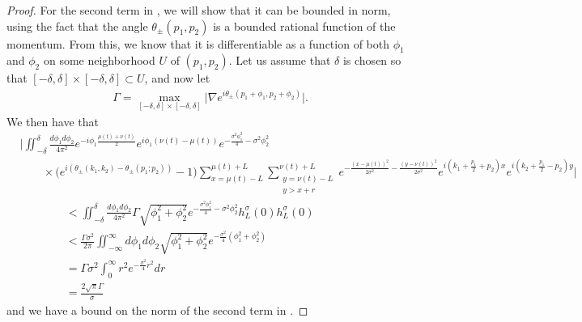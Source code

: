 \documentclass[../thesis-main/thesis-main]{subfiles}
\begin{document}
\begin{proof}
For the second term in , we will show that it can be bounded in norm, using the fact that the angle $\theta_\pm(p_1,p_2)$ is a bounded rational function of the momentum.  From this, we know that it is differentiable as a function of both $\phi_1$ and $\phi_2$ on some neighborhood $U$ of $(p_1,p_2)$.  Let us assume that $\delta$ is chosen so that $[-\delta,\delta]\times [-\delta,\delta] \subset U$, and now let
\begin{align}
  \Gamma = \max_{[-\delta,\delta]\times [-\delta,\delta]} \big|\nabla e^{i \theta_{\pm}(p_1 +\phi_1, p_2 +\phi_2)}\big|.
\end{align}
  We then have that
\begin{align}
  &\Bigg| \iint_{-\delta}^\delta \frac{d\phi_1d\phi_2}{4\pi^2} e^{-i \phi_1 \frac{\mu(t) + \nu(t)}{2}} e^{i \phi_1(\nu(t) - \mu(t))} e^{-\frac{\sigma^2 \phi_1^2}{4} - \sigma^2 \phi_2^2} \nonumber\\
  & \qquad \times \Big(e^{i(\theta_{\pm}(k_1,k_2) - \theta_{\pm}(p_1;p_2))} - 1\Big)\sum_{x=\mu(t)-L}^{\mu(t)+L} \sum_{\substack{y=\nu(t)-L\\y>x+r}}^{\nu(t)+L} e^{-\frac{(x-\mu(t))^2}{2\sigma^2} - \frac{(y-\nu(t))^2}{2\sigma^2}} e^{i (k_1 + \frac{p_1}{2} + p_2)x}e^{i(k_2 + \frac{p_1}{2} - p_2)y} \Bigg|\nonumber\\
  &\qquad \qquad < \iint_{-\delta}^\delta \frac{d\phi_1d\phi_2}{4\pi^2} \Gamma \sqrt{\phi_1^2 +\phi_2^2} e^{-\frac{\sigma^2 \phi_1^2}{4} - \sigma^2 \phi_2^2}h_L^\sigma (0) h_L^\sigma(0)\\
  &\qquad \qquad < \frac{\Gamma\sigma^2}{2\pi} \iint_{-\infty}^\infty d\phi_1 d\phi_2 \sqrt{\phi_1^2 + \phi_2^2} e^{-\frac{\sigma^2}{4} (\phi_1^2 + \phi_2^2)}\\
  &\qquad \qquad = \Gamma\sigma^2 \int_{0}^\infty r^2 e^{-\frac{\sigma^2}{4}r^2} dr\\
  &\qquad \qquad = \frac{2\sqrt{\pi}\Gamma}{\sigma}
\end{align}
and we have a bound on the norm of the second term in .


\end{proof}
\end{document}
